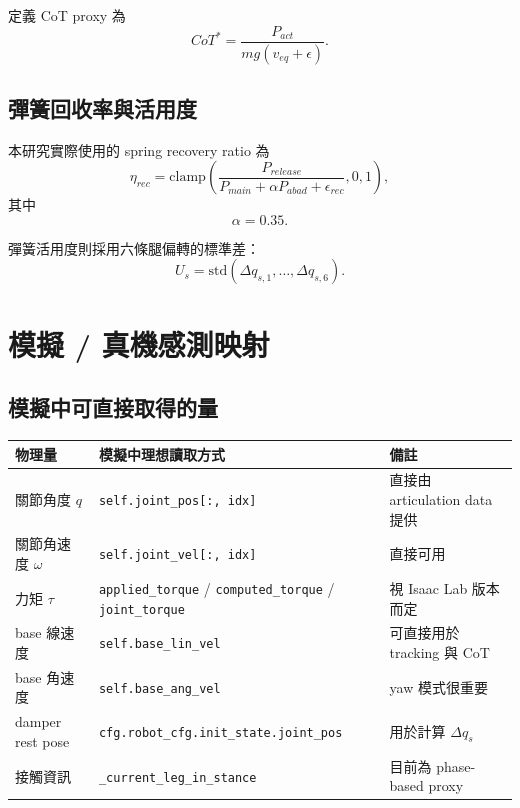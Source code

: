 \documentclass[12pt,a4paper,UTF8]{ctexart}
\begin{document}
定義 CoT proxy 為
\begin{equation}
CoT^* = \frac{P_{act}}{mg(v_{eq} + \epsilon)}.
\end{equation}

\subsection{彈簧回收率與活用度}

本研究實際使用的 spring recovery ratio 為
\begin{equation}
\eta_{rec}
=
\mathrm{clamp}\left(
\frac{P_{release}}{P_{main} + \alpha P_{abad} + \epsilon_{rec}},
0,1
\right),
\end{equation}
其中
\begin{equation}
\alpha = 0.35.
\end{equation}

彈簧活用度則採用六條腿偏轉的標準差：
\begin{equation}
U_s = \mathrm{std}(\Delta q_{s,1}, \ldots, \Delta q_{s,6}).
\end{equation}

\section{模擬 / 真機感測映射}

\subsection{模擬中可直接取得的量}

\begin{longtable}{p{3cm}p{4cm}p{6cm}}
\toprule
物理量 & 模擬中理想讀取方式 & 備註 \\
\midrule
關節角度 $q$ & \texttt{self.joint\_pos[:, idx]} & 直接由 articulation data 提供 \\
關節角速度 $\omega$ & \texttt{self.joint\_vel[:, idx]} & 直接可用 \\
力矩 $\tau$ & \texttt{applied\_torque} / \texttt{computed\_torque} / \texttt{joint\_torque} & 視 Isaac Lab 版本而定 \\
base 線速度 & \texttt{self.base\_lin\_vel} & 可直接用於 tracking 與 CoT \\
base 角速度 & \texttt{self.base\_ang\_vel} & yaw 模式很重要 \\
damper rest pose & \texttt{cfg.robot\_cfg.init\_state.joint\_pos} & 用於計算 $\Delta q_s$ \\
接觸資訊 & \texttt{\_current\_leg\_in\_stance} & 目前為 phase-based proxy \\
\bottomrule
\end{longtable}
\end{document}
